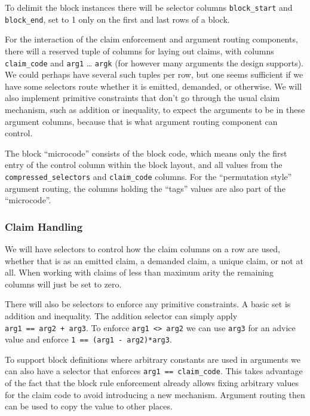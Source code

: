 \documentclass{article}
\theoremstyle{plain}
\theoremstyle{definition}
\begin{document}
To delimit the block instances there will be selector columns
\texttt{block\_start} and \texttt{block\_end}, set to 1 only on the
first and last rows of a block.

For the interaction of the claim enforcement and argument routing
components, there will a reserved tuple of columns for laying out
claims, with columns \texttt{claim\_code} and \texttt{arg1} \ldots{}
\texttt{argk} (for however many arguments the design supports). We could
perhaps have several such tuples per row, but one seems sufficient if we
have some selectors route whether it is emitted, demanded, or otherwise.
We will also implement primitive constraints that don't go through the
usual claim mechanism, such as addition or inequality, to expect the
arguments to be in these argument columns, because that is what argument
routing component can control.

The block ``microcode'' consists of the block code, which means
only the first entry of the control column within the block layout,
and all values from the \texttt{compressed\_selectors} and \texttt{claim\_code} columns.
For the ``permutation style'' argument routing, the columns holding the
``tags'' values are also part of the ``microcode''.

\subsubsection{Claim Handling}\label{claim-handling}

We will have selectors to control how the claim columns on a row are
used, whether that is as an emitted claim, a demanded claim, a unique
claim, or not at all. When working with claims of less than maximum
arity the remaining columns will just be set to zero.

There will also be selectors to enforce any primitive constraints. A
basic set is addition and inequality. The addition selector can simply
apply \texttt{arg1\ ==\ arg2\ +\ arg3}. To enforce
\texttt{arg1\ \textless{}\textgreater{}\ arg2} we can use \texttt{arg3}
for an advice value and enforce \texttt{1\ ==\ (arg1\ -\ arg2)*arg3}.

To support block definitions where arbitrary constants are used in
arguments we can also have a selector that enforces
\texttt{arg1\ ==\ claim\_code}. This takes advantage of the fact that
the block rule enforcement already allows fixing arbitrary values for
the claim code to avoid introducing a new mechanism. Argument routing
then can be used to copy the value to other places.
\end{document}
